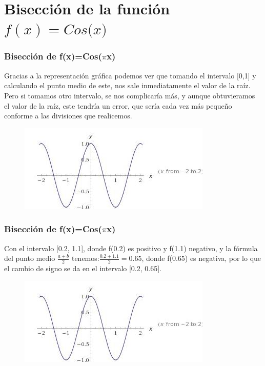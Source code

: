 \documentclass{beamer}
\begin{document}
\section{Bisección de la función $f(x)=Cos($\pi$x)$} 

\begin{frame}
\frametitle{Bisección de f(x)=Cos($\pi$x)}

\begin{block}{}
Gracias a la representación gráfica podemos ver que tomando el intervalo [0,1] y calculando el punto medio de este, nos sale inmediatamente el valor de la raíz. Pero si tomamos otro intervalo, se nos complicaría más, y aunque obtuvieramos el valor de la raíz, este tendría un error, que sería cada vez más pequeño conforme a las divisiones que realicemos.
\end{block}

\begin{figure}[b]
\begin{center}
\includegraphics[scale=0.8]{cos.jpeg}
\end{center}
\end{figure}

\end{frame}

\begin{frame}
\frametitle{Bisección de f(x)=Cos($\pi$x)}

\begin{block}{}
Con el intervalo [0.2, 1.1], donde f(0.2) es positivo y f(1.1) negativo, y la fórmula del punto medio $\frac{a+b}{2}$ tenemos:$\frac{0.2+1.1}{2}=0.65$, donde f(0.65) es negativa, por lo que el cambio de signo se da en el intervalo [0.2, 0.65].
\end{block}

\begin{figure}[b]
\begin{center}
\includegraphics[scale=0.8]{cos.jpeg}
\end{center}
\end{figure}

\end{frame}
\end{document}
